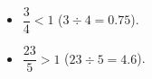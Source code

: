 \documentclass[12pt,a4paper]{article}
\begin{document}
	\begin{myexs}
		\begin{itemize}
			\item  $\dfrac{3}{4} < 1$ ($3 \div 4 = \num{0.75}$).
			
			\item $\dfrac{23}{5} > 1$ ($23 \div 5 = \num{4.6}$).
		\end{itemize}
	\end{myexs}
%
%
%
%
%
%



%
\end{document}
